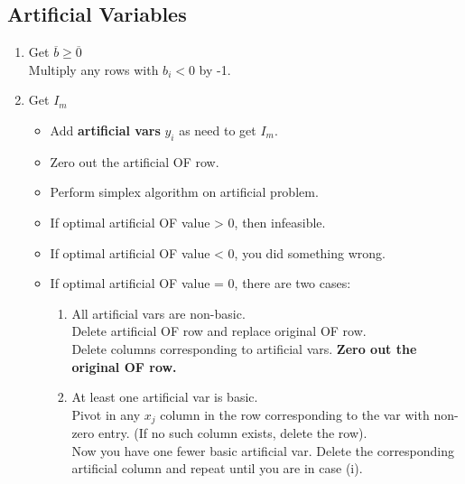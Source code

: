 \documentclass[10pt]{article}
\begin{document}
\begin{multicols*}{2}
\begin{minipage}{\columnwidth}
        \subsection*{Artificial Variables}
        \begin{enumerate}
            \item Get \(\overline{b} \geq \overline{0}\) \\
                  Multiply any rows with \(b_i < 0\) by -1.
            \item Get \(I_m\)
                  \begin{itemize}
                      \item Add \textbf{artificial vars} \(y_i\) as need to get \(I_m\).
                      \item Zero out the artificial OF row.
                      \item Perform simplex algorithm on artificial problem.
                      \item If optimal artificial OF value > 0, then infeasible.
                      \item If optimal artificial OF value < 0, you did something wrong.
                      \item If optimal artificial OF value = 0, there are two cases:
                            \begin{enumerate}[label=(\roman*)]
                                \item All artificial vars are non-basic. \\
                                      Delete artificial OF row and replace original OF row. \\
                                      Delete columns corresponding to artificial vars.
                                      \textbf{Zero out the original OF row.}
                                \item At least one artificial var is basic. \\
                                      Pivot in any \(x_j\) column in the row corresponding to the var with non-zero entry. (If no such column exists, delete the row). \\
                                      Now you have one fewer basic artificial var. Delete the corresponding artificial column and repeat until you are in case (i).
                            \end{enumerate}
                  \end{itemize}
        \end{enumerate}
    \end{minipage}
\end{multicols*}
\end{document}
